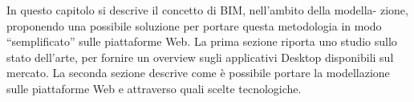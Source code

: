 In questo capitolo si descrive il concetto di BIM, nell’ambito della modella-
zione, proponendo una possibile soluzione per portare questa metodologia in modo ``semplificato'' sulle piattaforme Web.
La prima sezione riporta uno studio sullo stato dell’arte, per fornire un overview
sugli applicativi Desktop disponibili sul mercato. La seconda sezione descrive come è
possibile portare la modellazione sulle piattaforme Web e attraverso quali scelte tecnologiche.
